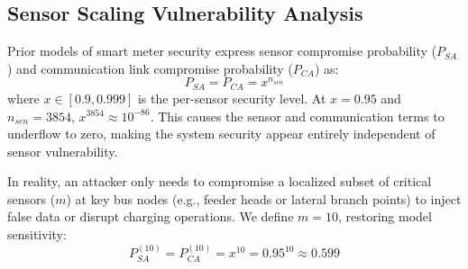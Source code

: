 \documentclass[10pt,twocolumn,journal]{IEEEtran}
\begin{document}
\subsection{Sensor Scaling Vulnerability Analysis}

Prior models of smart meter security express sensor compromise probability ($P_{SA}$) and communication link compromise probability ($P_{CA}$) as:
\begin{equation}
P_{SA} = P_{CA} = x^{n_{sen}}
\end{equation}
where $x \in [0.9, 0.999]$ is the per-sensor security level. At $x = 0.95$ and $n_{sen}=3854$, $x^{3854} \approx 10^{-86}$. This causes the sensor and communication terms to underflow to zero, making the system security appear entirely independent of sensor vulnerability.

In reality, an attacker only needs to compromise a localized subset of critical sensors ($m$) at key bus nodes (e.g., feeder heads or lateral branch points) to inject false data or disrupt charging operations. We define $m = 10$, restoring model sensitivity:
\begin{equation}
P_{SA}^{(10)} = P_{CA}^{(10)} = x^{10} = 0.95^{10} \approx 0.599
\end{equation}
\end{document}
